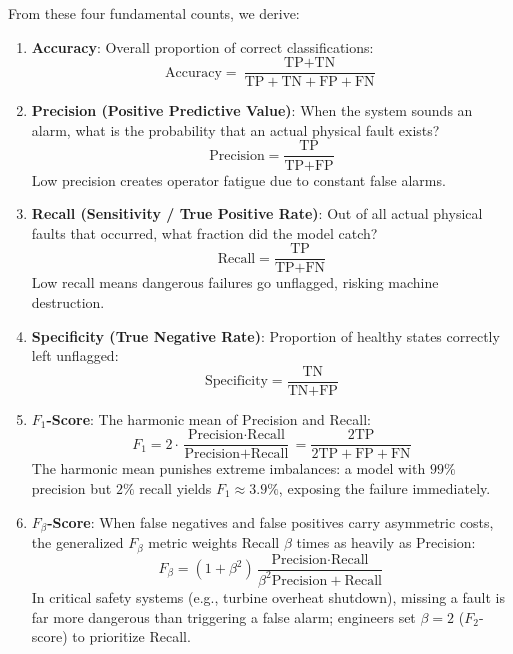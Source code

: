From these four fundamental counts, we derive:
\begin{enumerate}
    \item \textbf{Accuracy}: Overall proportion of correct classifications:
    \begin{equation}
    \text{Accuracy} = \frac{\text{TP} + \text{TN}}{\text{TP} + \text{TN} + \text{FP} + \text{FN}}\label{eq:accuracy}
    \end{equation}
    \item \textbf{Precision (Positive Predictive Value)}: When the system sounds an alarm, what is the probability that an actual physical fault exists?
    \begin{equation}
    \text{Precision} = \frac{\text{TP}}{\text{TP} + \text{FP}}\label{eq:precision}
    \end{equation}
    Low precision creates operator fatigue due to constant false alarms.
    \item \textbf{Recall (Sensitivity / True Positive Rate)}: Out of all actual physical faults that occurred, what fraction did the model catch?
    \begin{equation}
    \text{Recall} = \frac{\text{TP}}{\text{TP} + \text{FN}}\label{eq:recall}
    \end{equation}
    Low recall means dangerous failures go unflagged, risking machine destruction.
    \item \textbf{Specificity (True Negative Rate)}: Proportion of healthy states correctly left unflagged:
    \begin{equation}
    \text{Specificity} = \frac{\text{TN}}{\text{TN} + \text{FP}}\label{eq:specificity}
    \end{equation}
    \item \textbf{$F_1$-Score}: The harmonic mean of Precision and Recall:
    \begin{equation}
    F_1 = 2 \cdot \frac{\text{Precision} \cdot \text{Recall}}{\text{Precision} + \text{Recall}} = \frac{2\text{TP}}{2\text{TP} + \text{FP} + \text{FN}}\label{eq:f1_score}
    \end{equation}
    The harmonic mean punishes extreme imbalances: a model with $99\%$ precision but $2\%$ recall yields $F_1 \approx 3.9\%$, exposing the failure immediately.
    \item \textbf{$F_\beta$-Score}: When false negatives and false positives carry asymmetric costs, the generalized $F_\beta$ metric weights Recall $\beta$ times as heavily as Precision:
    \begin{equation}
    F_\beta = (1 + \beta^2) \frac{\text{Precision} \cdot \text{Recall}}{\beta^2 \text{Precision} + \text{Recall}}\label{eq:f_beta_score}
    \end{equation}
    In critical safety systems (e.g., turbine overheat shutdown), missing a fault is far more dangerous than triggering a false alarm; engineers set $\beta = 2$ ($F_2$-score) to prioritize Recall.
\end{enumerate}


